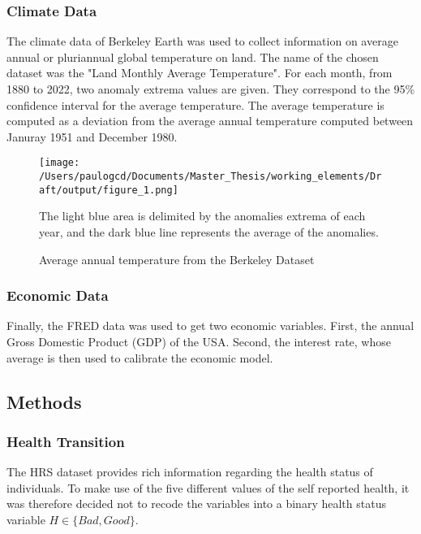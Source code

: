 \documentclass{article}
\begin{document}
\subsubsection{Climate Data}

The climate data of Berkeley Earth was used to collect information
on average annual or pluriannual global temperature on land.
The name of the chosen dataset was the "Land Monthly Average Temperature". 
For each month, from 1880 to 2022, two anomaly extrema values are given. 
They correspond to the 95\% confidence interval for the
average temperature. 
The average temperature is computed as a deviation from the average annual 
temperature computed between Januray 1951 and December 1980. 

\begin{figure}[H]
    \texttt{[image: /Users/paulogcd/Documents/Master\_Thesis/working\_elements/Draft/output/figure\_1.png]}
    \caption{Average annual temperature from the Berkeley Dataset}
    
    The light blue area is delimited by the anomalies extrema of each year, and
    the dark blue line represents the average of the anomalies.
\end{figure}

\subsubsection{Economic Data}

Finally, the FRED data was used to get two economic variables. 
First, the annual Gross Domestic Product (GDP) of the USA. 
Second, the interest rate, whose average is then used to calibrate the economic model.

\subsection{Methods}

\subsubsection{Health Transition}

The HRS dataset provides rich information regarding the health status of individuals. 
To make use of the five different values of the self reported health, it was therefore decided not to
recode the variables into a binary health status variable $H\in\{Bad, Good\}$. 
\end{document}
